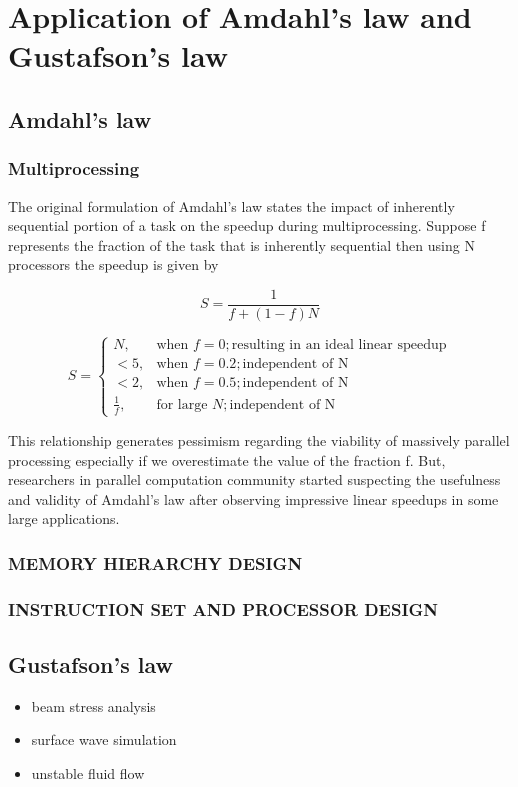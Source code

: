 \section{Application of Amdahl's law and Gustafson's law}

\subsection*{Amdahl's law}
\subsubsection*{Multiprocessing}
The original formulation of Amdahl's law states the impact of inherently sequential portion of a task on the speedup during multiprocessing. Suppose f represents the fraction of the task that is inherently sequential then using N processors the speedup is given by

\begin{equation}
    S = \frac{1}{f + (1-f) N}
\end{equation}

\[
S =
\begin{cases}
N , & \text{when } f=0; \text{resulting in an ideal linear speedup} \\
<5, & \text{when } f=0.2; \text{independent of N} \\
<2, & \text{when } f=0.5; \text{independent of N} \\
\frac{1}{f}, & \text{for large } N; \text{independent of N}
\end{cases}
\]

This relationship generates pessimism regarding the viability of massively parallel processing especially if we overestimate the value of the fraction f. But, researchers in parallel computation community started suspecting the usefulness and validity of Amdahl's law after observing impressive linear speedups in some large applications.

\subsubsection*{MEMORY HIERARCHY DESIGN}

\subsubsection*{INSTRUCTION SET AND PROCESSOR DESIGN}

\subsection*{Gustafson's law}
\begin{itemize}
    \item beam stress analysis
    \item surface wave simulation 
    \item unstable fluid flow
\end{itemize}